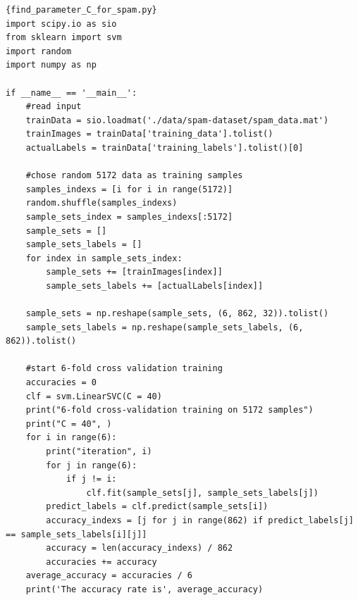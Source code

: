 \documentclass[11pt]{article}
\begin{document}
\newpage
\begin{lstlisting}
{find_parameter_C_for_spam.py}
import scipy.io as sio
from sklearn import svm
import random
import numpy as np

if __name__ == '__main__':
	#read input
	trainData = sio.loadmat('./data/spam-dataset/spam_data.mat')
	trainImages = trainData['training_data'].tolist()
	actualLabels = trainData['training_labels'].tolist()[0]

	#chose random 5172 data as training samples
	samples_indexs = [i for i in range(5172)]
	random.shuffle(samples_indexs)
	sample_sets_index = samples_indexs[:5172]
	sample_sets = []
	sample_sets_labels = []
	for index in sample_sets_index:
		sample_sets += [trainImages[index]]
		sample_sets_labels += [actualLabels[index]]

	sample_sets = np.reshape(sample_sets, (6, 862, 32)).tolist()
	sample_sets_labels = np.reshape(sample_sets_labels, (6, 862)).tolist()

	#start 6-fold cross validation training
	accuracies = 0
	clf = svm.LinearSVC(C = 40)
	print("6-fold cross-validation training on 5172 samples")
	print("C = 40", )
	for i in range(6):
		print("iteration", i)
		for j in range(6):
			if j != i:
				clf.fit(sample_sets[j], sample_sets_labels[j])
		predict_labels = clf.predict(sample_sets[i])
		accuracy_indexs = [j for j in range(862) if predict_labels[j] == sample_sets_labels[i][j]]
		accuracy = len(accuracy_indexs) / 862
		accuracies += accuracy
	average_accuracy = accuracies / 6
	print('The accuracy rate is', average_accuracy)


\end{lstlisting}
\end{document}
